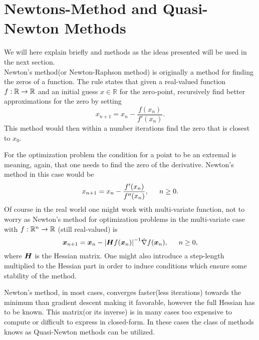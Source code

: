 \section{Newtons-Method and Quasi-Newton
Methods\label{sec:newtons-method_and_quasi-newton_methods}}
    We will here explain briefly  and
     methods as the ideas presented will be used in the
    next section. \\

    Newton's method\cite{linalgDavid}(or Newton-Raphson method) is originally a
    method for finding the zeros of a function. The rule states that given a
    real-valued function $f:\mathbb{R}\rightarrow\mathbb{R}$ and an initial guess
    $x\in\mathbb{R}$ for the zero-point, recursively find better
    approximations for the zero by setting
        \begin{equation}
            x_{n+1} = x_n - \frac{f(x_n)}{f'(x_n)}.
        \end{equation}
    This method would then within a number iterations find the zero that is
    closest to $x_0$.

    For the optimization problem the condition for a point to be an extremal is
     meaning, again, that one needs to find the zero of
    the derivative. Newton's method in this case would be
        \begin{equation}
            x_{n+1} = x_n - \frac{f'(x_n)}{f''(x_n)},\indent n\geq 0.
        \end{equation}
    Of course in the real world one might work with multi-variate function, not
    to worry as Newton's method for optimization problems in the multi-variate
    case with $f:\mathbb{R}^n\rightarrow\mathbb{R}$ (still real-valued) is
        \begin{equation}
            \blds{x}_{n+1} = \blds{x}_n -
            \abs{\blds{H}f(\blds{x}_n)}^{-1}\dot\nabla f(\blds{x}_n),\indent
            n\geq 0,
        \end{equation}
    where $\boldsymbol{{H}}$ is the Hessian matrix. One might also introduce a
    step-length multiplied to the Hessian part in order to induce
    conditions\cite{numOptNocWrig} which ensure some stability of the method.

    Newton's method, in most cases, converges faster(less iterations) towards
    the minimum than gradient descent making it favorable, however the full
    Hessian has to be known. This matrix(or its inverse) is in many cases too
    expensive to compute or difficult to express in closed-form. In these cases
    the class of methods knows as Quasi-Newton methods can be utilized. \\

